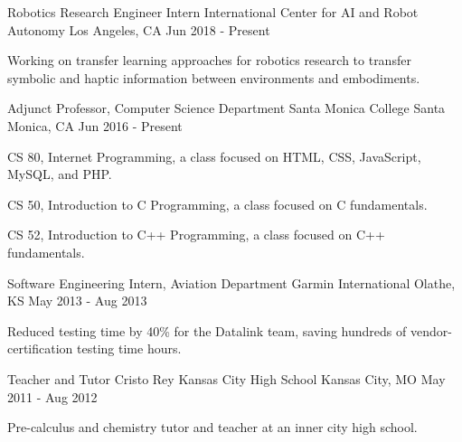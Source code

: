 


\begin{cventries}



\cventry
{Robotics Research Engineer Intern}
{International Center for AI and Robot Autonomy}
{Los Angeles, CA}
{Jun 2018 - Present}
{
\begin{cvitems}
\item Working on transfer learning approaches for robotics research to transfer symbolic and haptic information between environments and embodiments.
\end{cvitems}
}


\cventry
{Adjunct Professor, Computer Science Department}
{Santa Monica College}
{Santa Monica, CA}
{Jun 2016 - Present}
{
\begin{cvitems}
\item CS 80, Internet Programming, a class focused on HTML, CSS, JavaScript, MySQL, and PHP.
\item CS 50, Introduction to C Programming, a class focused on C fundamentals.
\item CS 52, Introduction to C++ Programming, a class focused on C++ fundamentals.
\end{cvitems}
}


\cventry
{Software Engineering Intern, Aviation Department}
{Garmin International}
{Olathe, KS}
{May 2013 - Aug 2013}
{
\begin{cvitems}
\item Reduced testing time by 40\% for the Datalink team, saving hundreds of vendor-certification testing time hours.
\end{cvitems}
}


\cventry
{Teacher and Tutor}
{Cristo Rey Kansas City High School}
{Kansas City, MO}
{May 2011 - Aug 2012}
{
\begin{cvitems}
\item Pre-calculus and chemistry tutor and teacher at an inner city high school.
\end{cvitems}
}

\end{cventries}